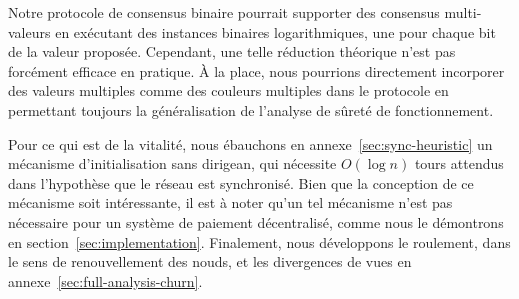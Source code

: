 \documentclass[letterpaper,twocolumn,10pt]{article}
\newcommand{\Oh}[1]{O(#1)}
\theoremstyle{definition}
\begin{document}
Notre protocole de consensus binaire pourrait supporter des consensus multi-valeurs en exécutant des instances binaires
logarithmiques, une pour chaque bit de la valeur proposée. Cependant, une telle réduction théorique n'est pas
forcément efficace en pratique. À la place, nous pourrions directement incorporer des valeurs multiples comme des
couleurs multiples dans le protocole en permettant toujours la généralisation de l'analyse de sûreté de fonctionnement.

Pour ce qui est de la vitalité, nous ébauchons en annexe~\ref{sec:sync-heuristic} un mécanisme d'initialisation sans
dirigean, qui nécessite $\Oh{\log{n}}$ tours attendus dans l'hypothèse que le réseau est synchronisé. Bien que
la conception de ce mécanisme soit intéressante, il est à noter qu'un tel mécanisme n'est pas nécessaire pour un système
de paiement décentralisé, comme nous le démontrons en section~\ref{sec:implementation}.
Finalement, nous développons le roulement, dans le sens de renouvellement des nouds, et les divergences de vues en annexe~\ref{sec:full-analysis-churn}.

\end{document}
